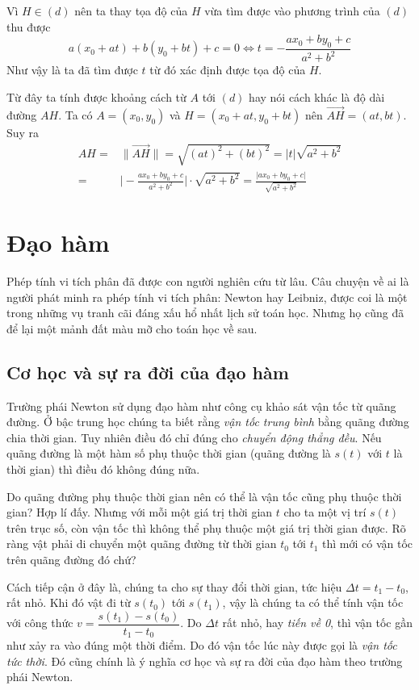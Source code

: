 Vì $H \in (d)$ nên ta thay tọa độ của $H$ vừa tìm được vào phương trình của $(d)$ thu được \[a (x_0 + at) + b (y_0 + bt) + c = 0 \Leftrightarrow t = -\frac{a x_0 + b y_0 + c}{a^2 + b^2}\]
Như vậy là ta đã tìm được $t$ từ đó xác định được tọa độ của $H$.

Từ đây ta tính được khoảng cách từ $A$ tới $(d)$ hay nói cách khác là độ dài đường $AH$. Ta có $A = (x_0, y_0)$ và $H = (x_0 + at, y_0 + bt)$ nên $\overrightarrow{AH} = (at, bt)$. Suy ra
\begin{align*}
	AH = & \lVert \overrightarrow{AH} \rVert = \sqrt{(at)^2 + (bt)^2} = \lvert t \rvert \sqrt{a^2 + b^2} \\ = & \Big| -\frac{a x_0 + b y_0 + c}{a^2 + b^2} \Big| \cdot \sqrt{a^2 + b^2} = \frac{\lvert a x_0 + b y_0 + c \rvert}{\sqrt{a^2 + b^2}}
\end{align*}

\section{Đạo hàm}

Phép tính vi tích phân đã được con người nghiên cứu từ lâu. Câu chuyện về ai là người phát minh ra phép tính vi tích phân: Newton hay Leibniz, được coi là một trong những vụ tranh cãi đáng xấu hổ nhất lịch sử toán học. Nhưng họ cũng đã để lại một mảnh đất màu mỡ cho toán học về sau.

\subsection*{Cơ học và sự ra đời của đạo hàm}

Trường phái Newton sử dụng đạo hàm như công cụ khảo sát vận tốc từ quãng đường. Ở bậc trung học chúng ta biết rằng \textit{vận tốc trung bình} bằng quãng đường chia thời gian. Tuy nhiên điều đó chỉ đúng cho \textit{chuyển động thẳng đều}. Nếu quãng đường là một hàm số phụ thuộc thời gian (quãng đường là $s(t)$ với $t$ là thời gian) thì điều đó không đúng nữa.

Do quãng đường phụ thuộc thời gian nên có thể là vận tốc cũng phụ thuộc thời gian? Hợp lí đấy. Nhưng với mỗi một giá trị thời gian $t$ cho ta một vị trí $s(t)$ trên trục số, còn vận tốc thì không thể phụ thuộc một giá trị thời gian được. Rõ ràng vật phải di chuyển một quãng đường từ thời gian $t_0$ tới $t_1$ thì mới có vận tốc trên quãng đường đó chứ?

Cách tiếp cận ở đây là, chúng ta cho sự thay đổi thời gian, tức hiệu $\Delta t = t_1 - t_0$, rất nhỏ. Khi đó vật đi từ $s(t_0)$ tới $s(t_1)$, vậy là chúng ta có thể tính vận tốc với công thức $v = \dfrac{s(t_1) - s(t_0)}{t_1 - t_0}$. Do $\Delta t$ rất nhỏ, hay \textit{tiến về 0}, thì vận tốc gần như xảy ra vào đúng một thời điểm. Do đó vận tốc lúc này được gọi là \textit{vận tốc tức thời}. Đó cũng chính là ý nghĩa cơ học và sự ra đời của đạo hàm theo trường phái Newton.

